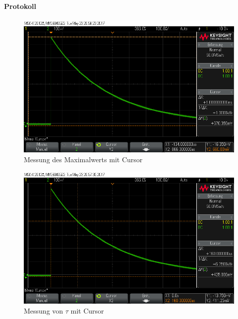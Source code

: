 \documentclass[10pt]{scrreprt}
\begin{document}
    \paragraph{Protokoll}
    \begin{center}
        \begin{figure}[H]
            \includegraphics[width=\textwidth]{scope_1.png}
            \caption{Messung des Maximalwerts mit Cursor}
        \end{figure}
    \end{center}
    \begin{center}
        \begin{figure}[H]
            \includegraphics[width=\textwidth]{scope_0.png}
            \caption{Messung von $\tau$ mit Cursor}
        \end{figure}
    \end{center}
\end{document}
